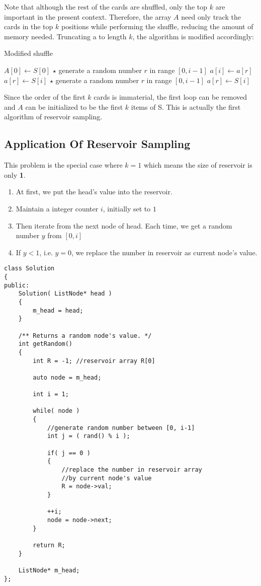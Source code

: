 Note that although the rest of the cards are shuffled, only the top $k$ are important in the present context. Therefore, the array $A$ need only track the cards in the top $k$ positions while performing the shuffle, reducing the amount of memory needed. Truncating a to length $k$, the algorithm is modified accordingly: 

\begin{algorithm}[H]
\caption{Modified shuffle}
\begin{algorithmic}[1]
\State $A[0]\gets S[0]$
\State $\star$ generate a random number $r$ in range $[0, i-1]$
\State $a[i]\gets a[r]$
\State $a[r]\gets S[i]$
\EndFor
{}
\State $\star$ generate a random number $r$ in range $[0, i-1]$
\State $a[r]\gets S[i]$
\EndIf
\EndFor
\EndProcedure
\end{algorithmic}
\end{algorithm}

Since the order of the first $ k $ cards is immaterial, the first loop can be removed and $A$ can be initialized to be the first $k$ items of S. This is actually the first algorithm of reservoir sampling.

\subsection{Application Of Reservoir Sampling}
This problem is the special case where $k=1$ which means the size of reservoir is only \textbf{1}.
\begin{enumerate}
\item At first, we put the head's value into the reservoir.
\item Maintain a integer counter $i$, initially set to $1$
\item Then iterate from the next node of head. Each time, we get a random number $y$ from $[0,i]$
\item If $y< 1$, i.e. $y=0$, we replace the number in reservoir as current node's value.
\end{enumerate}

\setcounter{lstlisting}{0}
\begin{lstlisting}[style=customc, caption={Reservoir Sampling}]
class Solution
{
public:
    Solution( ListNode* head )
    {
        m_head = head;
    }

    /** Returns a random node's value. */
    int getRandom()
    {
        int R = -1; //reservoir array R[0]

        auto node = m_head;

        int i = 1;

        while( node )
        {
            //generate random number between [0, i-1]
            int j = ( rand() % i );

            if( j == 0 )
            {
                //replace the number in reservoir array
                //by current node's value
                R = node->val;
            }

            ++i;
            node = node->next;
        }

        return R;
    }

    ListNode* m_head;
};
\end{lstlisting}